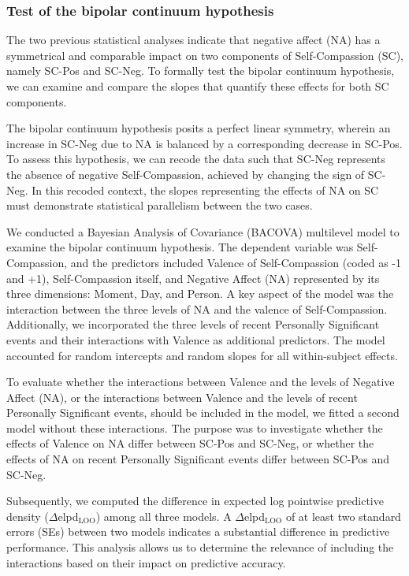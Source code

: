 \documentclass[
  man,floatsintext]{apa6}
\begin{document}
\hypertarget{test-of-the-bipolar-continuum-hypothesis}{%
\subsubsection{Test of the bipolar continuum hypothesis}\label{test-of-the-bipolar-continuum-hypothesis}}

The two previous statistical analyses indicate that negative affect (NA) has a symmetrical and comparable impact on two components of Self-Compassion (SC), namely SC-Pos and SC-Neg. To formally test the bipolar continuum hypothesis, we can examine and compare the slopes that quantify these effects for both SC components.

The bipolar continuum hypothesis posits a perfect linear symmetry, wherein an increase in SC-Neg due to NA is balanced by a corresponding decrease in SC-Pos. To assess this hypothesis, we can recode the data such that SC-Neg represents the absence of negative Self-Compassion, achieved by changing the sign of SC-Neg. In this recoded context, the slopes representing the effects of NA on SC must demonstrate statistical parallelism between the two cases.

We conducted a Bayesian Analysis of Covariance (BACOVA) multilevel model to examine the bipolar continuum hypothesis. The dependent variable was Self-Compassion, and the predictors included Valence of Self-Compassion (coded as -1 and +1), Self-Compassion itself, and Negative Affect (NA) represented by its three dimensions: Moment, Day, and Person. A key aspect of the model was the interaction between the three levels of NA and the valence of Self-Compassion. Additionally, we incorporated the three levels of recent Personally Significant events and their interactions with Valence as additional predictors. The model accounted for random intercepts and random slopes for all within-subject effects.

To evaluate whether the interactions between Valence and the levels of Negative Affect (NA), or the interactions between Valence and the levels of recent Personally Significant events, should be included in the model, we fitted a second model without these interactions. The purpose was to investigate whether the effects of Valence on NA differ between SC-Pos and SC-Neg, or whether the effects of NA on recent Personally Significant events differ between SC-Pos and SC-Neg.

Subsequently, we computed the difference in expected log pointwise predictive density (\(\Delta\)elpd\(_{\text{LOO}}\)) among all three models. A \(\Delta\)elpd\(_{\text{LOO}}\) of at least two standard errors (SEs) between two models indicates a substantial difference in predictive performance. This analysis allows us to determine the relevance of including the interactions based on their impact on predictive accuracy.
\end{document}
